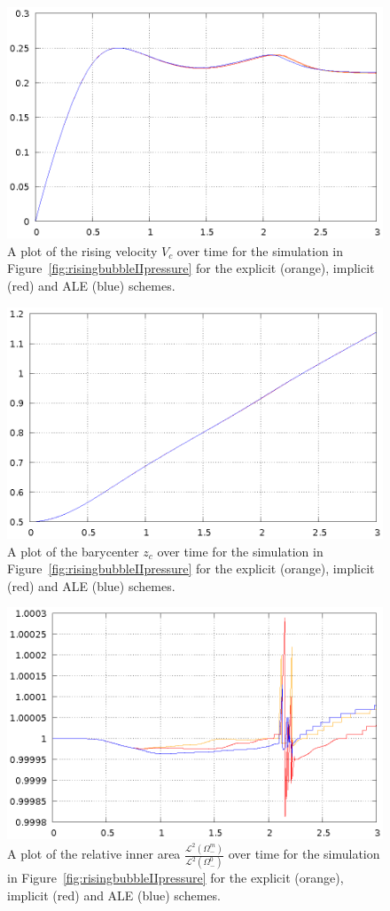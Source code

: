 \documentclass[a4paper,12pt,onecolumn]{article}
\begin{document}
\begin{figure}[htbp]
\centering
\includegraphics[width=.45\textwidth]
{figures/rising_bubble_II_rising_velocity.ps}
\caption[Navier--Stokes rising bubble II rising velocity]
{A plot of the rising velocity $V_c$ over time for the simulation in
Figure~\ref{fig:risingbubbleIIpressure} for the explicit (orange), implicit
(red) and ALE (blue) schemes.}
\label{fig:risingbubbleIIrisingvelocity}
\end{figure}

\begin{figure}[htbp]
\centering
\includegraphics[width=.45\textwidth]
{figures/rising_bubble_II_barycenter.ps}
\caption[Navier--Stokes rising bubble II barycenter]
{A plot of the barycenter $z_c$ over time for the simulation in
Figure~\ref{fig:risingbubbleIIpressure} for the explicit (orange), implicit
(red) and ALE (blue) schemes.}
\label{fig:risingbubbleIIbarycenter}
\end{figure}

\begin{figure}[htbp]
\centering
\includegraphics[width=.45\textwidth]
{figures/rising_bubble_II_inner_volume.ps}
\caption[Navier--Stokes rising bubble II inner area]
{A plot of the relative inner area
$\frac{\mathcal{L}^2(\Omega^m_-)}{\mathcal{L}^2(\Omega^0_-)}$ over time for the
simulation in Figure~\ref{fig:risingbubbleIIpressure} for the explicit
(orange), implicit (red) and ALE (blue) schemes.}
\label{fig:risingbubbleIIinnervolume}
\end{figure}
\end{document}
